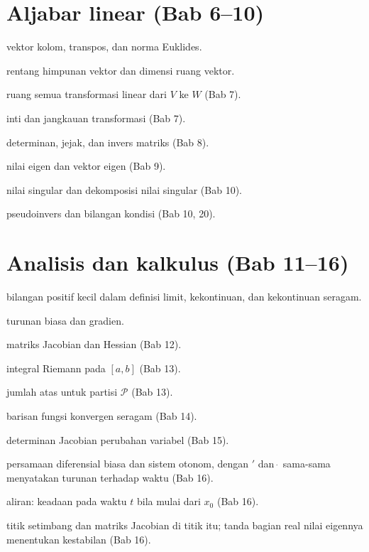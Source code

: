 \documentclass[11pt,a4paper,oneside]{book}
\theoremstyle{definition}
\theoremstyle{plain}
\theoremstyle{remark}
\begin{document}
\section*{Aljabar linear (Bab 6--10)}
\begin{description}[style=nextline,itemsep=0.25em]
  \item[$\mathbf{x}$, $\mathbf{x}^{\top}$, $\|\mathbf{x}\|$] vektor kolom,
        transpos, dan norma Euklides.
  \item[$\operatorname{span} S$, $\dim V$] rentang himpunan vektor dan dimensi
        ruang vektor.
  \item[$\mathcal{L}(V,W)$] ruang semua transformasi linear dari $V$ ke $W$ (Bab 7).
  \item[$\ker T$, $\operatorname{im} T$] inti dan jangkauan transformasi (Bab 7).
  \item[$\det A$, $\operatorname{tr} A$, $A^{-1}$] determinan, jejak, dan invers
        matriks (Bab 8).
  \item[$\lambda$, $\mathbf{v}$] nilai eigen dan vektor eigen (Bab 9).
  \item[$\sigma_i$, $A=U\Sigma V^{\top}$] nilai singular dan dekomposisi nilai
        singular (Bab 10).
  \item[$A^{+}$, $\kappa(A)$] pseudoinvers dan bilangan kondisi (Bab 10, 20).
\end{description}

\section*{Analisis dan kalkulus (Bab 11--16)}
\begin{description}[style=nextline,itemsep=0.25em]
  \item[$\varepsilon$, $\delta$] bilangan positif kecil dalam definisi limit,
        kekontinuan, dan kekontinuan seragam.
  \item[$f'(x)$, $\nabla f$] turunan biasa dan gradien.
  \item[$J_f$, $H_f$] matriks Jacobian dan Hessian (Bab 12).
  \item[$\int_a^b f$] integral Riemann pada $[a,b]$ (Bab 13).
  \item[$\sum_{\mathcal{P}} M_i \Delta x_i$] jumlah atas untuk partisi
        $\mathcal{P}$ (Bab 13).
  \item[$f_n \rightrightarrows f$] barisan fungsi konvergen seragam (Bab 14).
  \item[$\dfrac{\partial(x,y)}{\partial(u,v)}$] determinan Jacobian perubahan
        variabel (Bab 15).
  \item[$x'=f(t,x)$, $\dot{x}=F(x)$] persamaan diferensial biasa dan sistem
        otonom, dengan $'$ dan $\dot{\ }$ sama-sama menyatakan turunan terhadap
        waktu (Bab 16).
  \item[$\varphi_t(x_0)$] aliran: keadaan pada waktu $t$ bila mulai dari $x_0$
        (Bab 16).
  \item[$x^{*}$, $J_F(x^{*})$] titik setimbang dan matriks Jacobian di titik itu;
        tanda bagian real nilai eigennya menentukan kestabilan (Bab 16).
\end{description}
\end{document}
